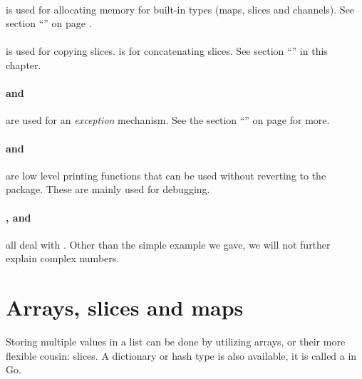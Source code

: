 \paragraph{} is used for allocating memory for built-in
types (maps, slices and channels). See section 
``'' on page
\pageref{sec:allocation with make}.

\paragraph{} is used for copying slices.  is 
for concatenating slices. See section ``'' in this
chapter.

\paragraph{ and } are used for an 
\emph{exception} mechanism. See the section ``'' on 
page \pageref{sec:panic} for more.

\paragraph{ and } are low level printing
functions that can be used without reverting to the
package. These are mainly used for debugging.

\paragraph{,  and } all deal with
. Other than the simple example
we gave, we will not further explain complex numbers.


\section{Arrays, slices and maps}
\label{sec:arrays}
Storing multiple values in a list can be done by utilizing arrays, or
their more flexible cousin: slices. A dictionary or hash type is also
available, it is called a  in Go.


